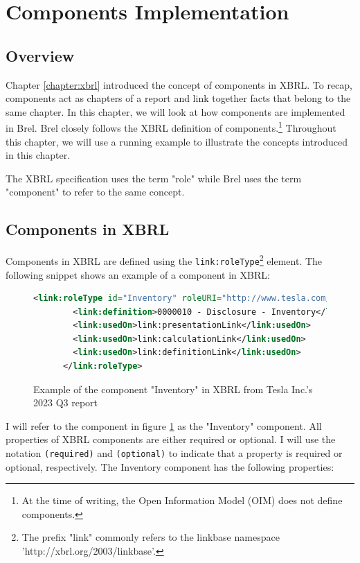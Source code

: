 \section{Components Implementation}

\subsection{Overview}

Chapter \ref{chapter:xbrl} introduced the concept of components in XBRL.
To recap, components act as chapters of a report and link together facts that belong to the same chapter.
In this chapter, we will look at how components are implemented in Brel.\cite{tesla_10q_2023_q3}
Brel closely follows the XBRL definition of components.\footnote{At the time of writing, the Open Information Model (OIM) does not define components.}
Throughout this chapter, we will use a running example to illustrate the concepts introduced in this chapter.

The XBRL specification uses the term "role" while Brel uses the term "component" to refer to the same concept. 

\subsection{Components in XBRL}

Components in XBRL are defined using the \texttt{link:roleType}\footnote{The prefix "link" commonly refers to the linkbase namespace 'http://xbrl.org/2003/linkbase'.} element. 
The following snippet shows an example of a component in XBRL:

\begin{figure}[H]
    \caption{Example of the component "Inventory" in XBRL from Tesla Inc.'s 2023 Q3 report\cite{tesla_10q_2023_q3}}
    \label{fig:example_component_xbrl}
    \begin{lstlisting}[language=XML,basicstyle=\fontsize{7}{10}\selectfont\ttfamily]
      <link:roleType id="Inventory" roleURI="http://www.tesla.com/role/Inventory">
        <link:definition>0000010 - Disclosure - Inventory</link:definition>
        <link:usedOn>link:presentationLink</link:usedOn>
        <link:usedOn>link:calculationLink</link:usedOn>
        <link:usedOn>link:definitionLink</link:usedOn>
      </link:roleType>
    \end{lstlisting}
\end{figure}

I will refer to the component in figure \ref{fig:example_component_xbrl} as the "Inventory" component.
All properties of XBRL components are either required or optional.
I will use the notation \texttt{(required)} and \texttt{(optional)} to indicate that a property is required or optional, respectively.
The Inventory component has the following properties:

